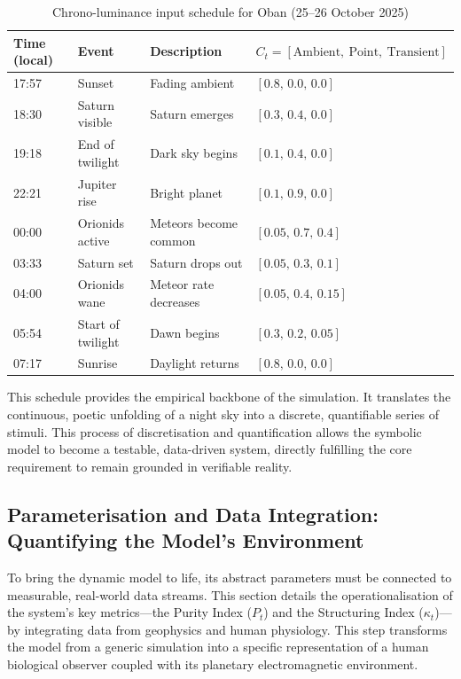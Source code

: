 \documentclass{article}
\newcommand{\Ct}{C_t}
\begin{document}
\begin{table}[h]
    \centering
    \caption{Chrono-luminance input schedule for Oban (25--26 October 2025)}
    \label{tab:chrono}
    \begin{tabular}{llll}
        \toprule
        \textbf{Time (local)} & \textbf{Event} & \textbf{Description} & $\Ct=[\text{Ambient},\ \text{Point},\ \text{Transient}]$ \\
        \midrule
        17:57 & Sunset & Fading ambient & $[0.8,\,0.0,\,0.0]$ \\
        18:30 & Saturn visible & Saturn emerges & $[0.3,\,0.4,\,0.0]$ \\
        19:18 & End of twilight & Dark sky begins & $[0.1,\,0.4,\,0.0]$ \\
        22:21 & Jupiter rise & Bright planet & $[0.1,\,0.9,\,0.0]$ \\
        00:00 & Orionids active & Meteors become common & $[0.05,\,0.7,\,0.4]$ \\
        03:33 & Saturn set & Saturn drops out & $[0.05,\,0.3,\,0.1]$ \\
        04:00 & Orionids wane & Meteor rate decreases & $[0.05,\,0.4,\,0.15]$ \\
        05:54 & Start of twilight & Dawn begins & $[0.3,\,0.2,\,0.05]$ \\
        07:17 & Sunrise & Daylight returns & $[0.8,\,0.0,\,0.0]$ \\
        \bottomrule
    \end{tabular}
\end{table}

This schedule provides the empirical backbone of the simulation. It translates the continuous, poetic unfolding of a night sky into a discrete, quantifiable series of stimuli. This process of discretisation and quantification allows the symbolic model to become a testable, data-driven system, directly fulfilling the core requirement to remain grounded in verifiable reality.

\subsection{Parameterisation and Data Integration: Quantifying the Model's Environment}

To bring the dynamic model to life, its abstract parameters must be connected to measurable, real-world data streams. This section details the operationalisation of the system's key metrics---the Purity Index ($P_t$) and the Structuring Index ($\kappa_t$)---by integrating data from geophysics and human physiology. This step transforms the model from a generic simulation into a specific representation of a human biological observer coupled with its planetary electromagnetic environment.
\end{document}
